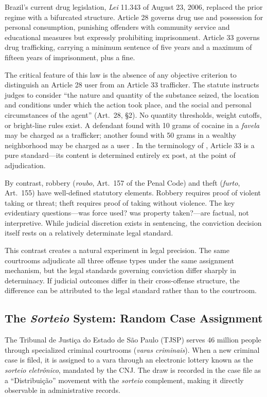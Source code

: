 \documentclass[12pt]{article}
\begin{document}
Brazil's current drug legislation, \textit{Lei} 11.343 of August 23, 2006, replaced the prior regime with a bifurcated structure. Article 28 governs drug use and possession for personal consumption, punishing offenders with community service and educational measures but expressly prohibiting imprisonment. Article 33 governs drug trafficking, carrying a minimum sentence of five years and a maximum of fifteen years of imprisonment, plus a fine.

The critical feature of this law is the absence of any objective criterion to distinguish an Article 28 user from an Article 33 trafficker. The statute instructs judges to consider ``the nature and quantity of the substance seized, the location and conditions under which the action took place, and the social and personal circumstances of the agent'' (Art.\ 28, \S2). No quantity thresholds, weight cutoffs, or bright-line rules exist. A defendant found with 10 grams of cocaine in a \textit{favela} may be charged as a trafficker; another found with 50 grams in a wealthy neighborhood may be charged as a user \citep{boiteux2006, jesusfilho2019}. In the terminology of \citet{kaplow1992}, Article 33 is a pure standard---its content is determined entirely ex post, at the point of adjudication.

By contrast, robbery (\textit{roubo}, Art.\ 157 of the Penal Code) and theft (\textit{furto}, Art.\ 155) have well-defined statutory elements. Robbery requires proof of violent taking or threat; theft requires proof of taking without violence. The key evidentiary questions---was force used? was property taken?---are factual, not interpretive. While judicial discretion exists in sentencing, the conviction decision itself rests on a relatively determinate legal standard.

This contrast creates a natural experiment in legal precision. The same courtrooms adjudicate all three offense types under the same assignment mechanism, but the legal standards governing conviction differ sharply in determinacy. If judicial outcomes differ in their cross-offense structure, the difference can be attributed to the legal standard rather than to the courtroom.

\subsection{The \textit{Sorteio} System: Random Case Assignment}

The Tribunal de Justi\c{c}a do Estado de S\~ao Paulo (TJSP) serves 46 million people through specialized criminal courtrooms (\textit{varas criminais}). When a new criminal case is filed, it is assigned to a vara through an electronic lottery known as the \textit{sorteio eletr\^onico}, mandated by the CNJ. The draw is recorded in the case file as a ``Distribui\c{c}\~ao'' movement with the \textit{sorteio} complement, making it directly observable in administrative records.
\end{document}
